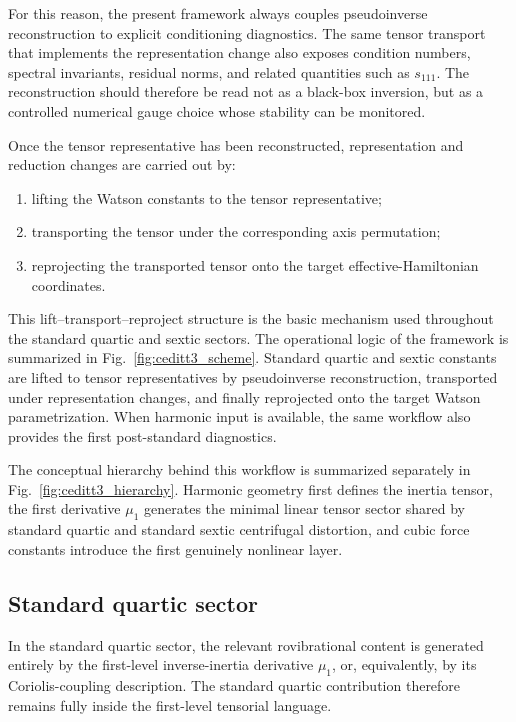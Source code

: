 \documentclass[journal=jacsat,manuscript=article]{achemso}
\begin{document}
For this reason, the present framework always couples pseudoinverse
reconstruction to explicit conditioning diagnostics. The same tensor
transport that implements the representation change also exposes
condition numbers, spectral invariants, residual norms, and related
quantities such as $s_{111}$. The reconstruction should therefore be
read not as a black-box inversion, but as a controlled numerical gauge
choice whose stability can be monitored.

Once the tensor representative has been reconstructed, representation
and reduction changes are carried out by:
\begin{enumerate}
\item lifting the Watson constants to the tensor representative;
\item transporting the tensor under the corresponding axis permutation;
\item reprojecting the transported tensor onto the target effective-Hamiltonian
coordinates.
\end{enumerate}

This lift--transport--reproject structure is the basic mechanism used
throughout the standard quartic and sextic sectors. The operational
logic of the framework is summarized in Fig.~\ref{fig:ceditt3_scheme}.
Standard quartic and sextic constants are lifted to tensor
representatives by pseudoinverse reconstruction, transported under
representation changes, and finally reprojected onto the target
Watson parametrization. When harmonic input is available, the same
workflow also provides the first post-standard diagnostics.



The conceptual hierarchy behind this workflow is summarized separately
in Fig.~\ref{fig:ceditt3_hierarchy}. Harmonic geometry first defines
the inertia tensor, the first derivative $\mu_1$ generates the minimal
linear tensor sector shared by standard quartic and standard sextic
centrifugal distortion, and cubic force constants introduce the first
genuinely nonlinear layer.



\subsection{Standard quartic sector}

In the standard quartic sector, the relevant rovibrational content is
generated entirely by the first-level inverse-inertia derivative
$\mu_1$, or, equivalently, by its Coriolis-coupling description. The
standard quartic contribution therefore remains fully inside the
first-level tensorial language.
\end{document}
